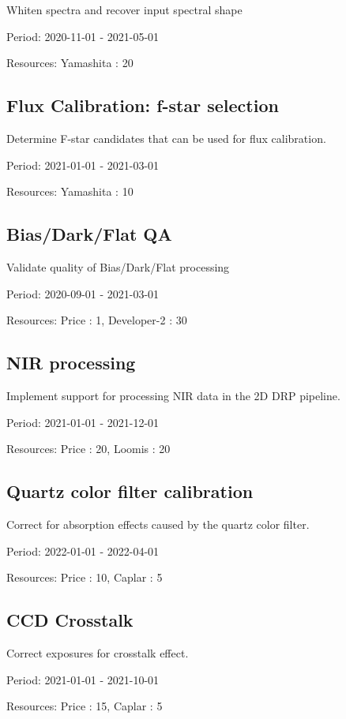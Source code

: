 Whiten spectra and recover input spectral shape

Period: 2020-11-01 - 2021-05-01

Resources: Yamashita : 20

\subsection{Flux Calibration: f-star selection}

Determine F-star candidates that can be used for flux calibration.

Period: 2021-01-01 - 2021-03-01

Resources: Yamashita : 10

\subsection{Bias/Dark/Flat QA}

Validate quality of Bias/Dark/Flat processing

Period: 2020-09-01 - 2021-03-01

Resources: Price : 1, Developer-2 : 30

\subsection{NIR processing}

Implement support for processing NIR data in the 2D DRP pipeline.

Period: 2021-01-01 - 2021-12-01

Resources: Price : 20, Loomis : 20

\subsection{Quartz color filter calibration}

Correct for absorption effects caused by the quartz color filter.

Period: 2022-01-01 - 2022-04-01

Resources: Price : 10, Caplar : 5

\subsection{CCD Crosstalk}

Correct exposures for crosstalk effect.

Period: 2021-01-01 - 2021-10-01

Resources: Price : 15, Caplar : 5

